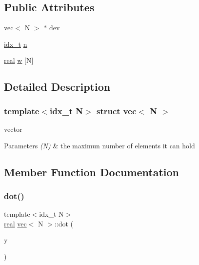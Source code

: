\subsection*{Public Attributes}
\begin{DoxyCompactItemize}
\item 
\hyperlink{structvec}{vec}$<$ N $>$ $\ast$ \hyperlink{structvec_a8ea19d04a43f99871fcf4bff8b5b25b2}{dev}
\item 
\hyperlink{vgg__util_8h_a8e93478a00e685bea5e6a3f617bf03a3}{idx\+\_\+t} \hyperlink{structvec_a8e2947aa75530f74cac781347dd97e98}{n}
\item 
\hyperlink{vgg__util_8h_a1082d08aaa761215ec83e7149f27ad16}{real} \hyperlink{structvec_a3aa2e8ed9a81937b8527eaef24d4437d}{w} \mbox{[}N\mbox{]}
\end{DoxyCompactItemize}


\subsection{Detailed Description}
\subsubsection*{template$<$idx\+\_\+t N$>$\newline
struct vec$<$ N $>$}

vector 


\begin{DoxyParams}{Parameters}
{\em (\+N)} & the maximun number of elements it can hold \\
\hline
\end{DoxyParams}


\subsection{Member Function Documentation}
\mbox{\label{structvec_a025135937b054f373be71ef417f2bc89}} 
\subsubsection{\texorpdfstring{dot()}{dot()}}
{\footnotesize\ttfamily template$<$idx\+\_\+t N$>$ \\
\hyperlink{vgg__util_8h_a1082d08aaa761215ec83e7149f27ad16}{real} \hyperlink{structvec}{vec}$<$ N $>$\+::dot (\begin{DoxyParamCaption}\item[{\hyperlink{structvec}{vec}$<$ N $>$ \&}]{y }\end{DoxyParamCaption})\hspace{0.3cm}{\ttfamily [inline]}}



